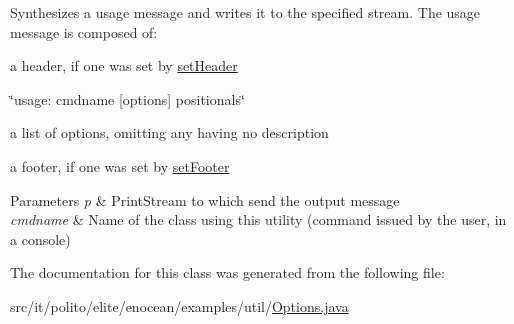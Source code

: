 Synthesizes a usage message and writes it to the specified stream. The usage message is composed of\+: 
\begin{DoxyItemize}
\item a header, if one was set by \hyperlink{classit_1_1polito_1_1elite_1_1enocean_1_1examples_1_1util_1_1_options_a9e2db7144be1ca4a580754204a416b52}{set\+Header} 
\item \char`\"{}usage\+:  cmdname \mbox{[}options\mbox{]} positionals\char`\"{} 
\item a list of options, omitting any having no description 
\item a footer, if one was set by \hyperlink{classit_1_1polito_1_1elite_1_1enocean_1_1examples_1_1util_1_1_options_a9b1cfe704a99879244c220539a1da10a}{set\+Footer} 
\end{DoxyItemize}
\begin{DoxyParams}{Parameters}
{\em p} & Print\+Stream to which send the output message \\
\hline
{\em cmdname} & Name of the class using this utility (command issued by the user, in a console) \\
\hline
\end{DoxyParams}


The documentation for this class was generated from the following file\+:\begin{DoxyCompactItemize}
\item 
src/it/polito/elite/enocean/examples/util/\hyperlink{_options_8java}{Options.\+java}\end{DoxyCompactItemize}
